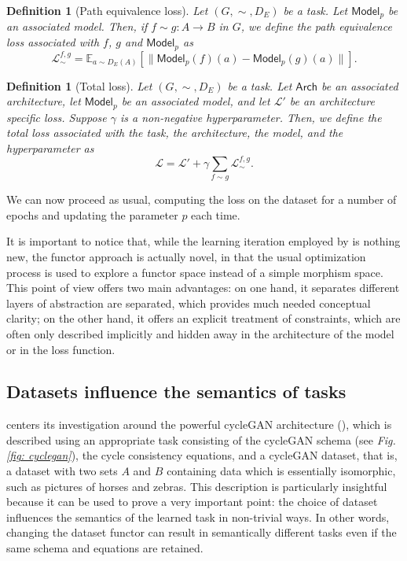 \documentclass[11pt,a4paper,openright,twoside]{report}
\newcounter{mycounter}
\theoremstyle{plain}
\newtheorem{definition}[mycounter]{Definition}
\theoremstyle{definition}
\begin{document}
\begin{definition}[Path equivalence loss]
  Let $(G,{\sim},D_E)$ be a task. Let $\mathsf{Model}_p$ be an associated model. Then, if $f \sim g: A \to B$ in $G$, we define the path equivalence loss associated with $f$, $g$ and $\mathsf{Model}_p$ as 
  \[\mathcal{L}_{\sim}^{f,g} = \mathbb{E}_{a \sim D_E(A)}[\|\mathsf{Model}_p(f)(a) - \mathsf{Model}_p(g)(a)\|].\]  
\end{definition}

\begin{definition}[Total loss]
  Let $(G,{\sim},D_E)$ be a task. Let $\mathsf{Arch}$ be an associated architecture, let $\mathsf{Model}_p$ be an associated model, and let $\mathcal{L}'$ be an architecture specific loss. Suppose $\gamma$ is a non-negative hyperparameter. Then, we define the total loss associated with the task, the architecture, the model, and the hyperparameter as
  \begin{equation}
    \label{eq: sumoflosses}
    \mathcal{L} = \mathcal{L}' + \gamma\sum_{f \sim g}\mathcal{L}_{\sim}^{f,g}.
  \end{equation}
\end{definition}

We can now proceed as usual, computing the loss on the dataset for a number of epochs and updating the parameter $p$ each time.

It is important to notice that, while the learning iteration employed by \cite{gavranovic2019compositional} is nothing new, the functor approach is actually novel, in that the usual optimization process is used to explore a functor space instead of a simple morphism space. This point of view offers two main advantages: on one hand, it separates different layers of abstraction are separated, which provides much needed conceptual clarity; on the other hand, it offers an explicit treatment of constraints, which are often only described implicitly and hidden away in the architecture of the model or in the loss function. 

\subsection{Datasets influence the semantics of tasks}

\cite{gavranovic2019compositional} centers its investigation around the powerful cycleGAN architecture (\cite{zhu2017unpaired}), which is described using an appropriate task consisting of the cycleGAN schema (see \textit{Fig. \ref{fig: cyclegan}}), the cycle consistency equations, and a cycleGAN dataset, that is, a dataset with two sets $A$ and $B$ containing data which is essentially isomorphic, such as pictures of horses and zebras. This description is particularly insightful because it can be used to prove a very important point: the choice of dataset influences the semantics of the learned task in non-trivial ways. In other words, changing the dataset functor can result in semantically different tasks even if the same schema and equations are retained. 
\end{document}
